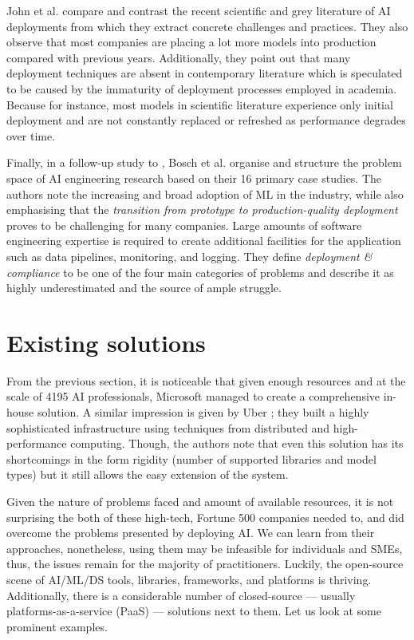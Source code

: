 John et al. \cite{john2020architecting} compare and contrast the recent scientific and grey literature of AI deployments from which they extract concrete challenges and practices. They also observe that most companies are placing a lot more models into production compared with previous years. Additionally, they point out that many deployment techniques are absent in contemporary literature which is speculated to be caused by the immaturity of deployment processes employed in academia. Because for instance, most models in scientific literature experience only initial deployment and are not constantly replaced or refreshed as performance degrades over time.

Finally, in a follow-up study to \cite{john2020architecting}, Bosch et al. \cite{bosch2021engineering} organise and structure the problem space of AI engineering research based on their 16 primary case studies. The authors note the increasing and broad adoption of ML in the industry, while also emphasising that the \textit{transition from prototype to production-quality deployment} proves to be challenging for many companies. Large amounts of software engineering expertise is required to create additional facilities for the application such as data pipelines, monitoring, and logging. They define \textit{deployment \& compliance} to be one of the four main categories of problems and describe it as highly underestimated and the source of ample struggle.

\section{Existing solutions} \label{section:existing}

From the previous section, it is noticeable that given enough resources and at the scale of 4195 AI professionals, Microsoft managed to create a comprehensive in-house solution. A similar impression is given by Uber \cite{li2017scaling}; they built a highly sophisticated infrastructure using techniques from distributed and high-performance computing. Though, the authors note that even this solution has its shortcomings in the form rigidity (number of supported libraries and model types) but it still allows the easy extension of the system.

Given the nature of problems faced and amount of available resources, it is not surprising the both of these high-tech, Fortune 500 companies needed to, and did overcome the problems presented by deploying AI. We can learn from their approaches, nonetheless, using them may be infeasible for individuals and SMEs, thus, the issues remain for the majority of practitioners. Luckily, the open-source scene of AI/ML/DS tools, libraries, frameworks, and platforms is thriving. Additionally, there is a considerable number of closed-source --- usually platforms-as-a-service (PaaS) --- solutions next to them. Let us look at some prominent examples.

